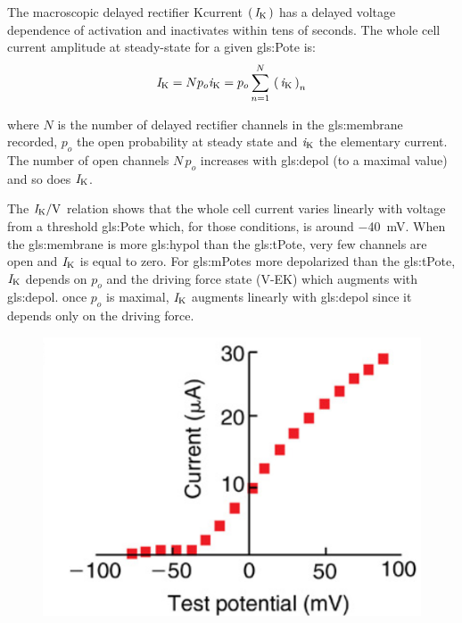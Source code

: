 \documentclass[class={myRUCProject}, crop=false]{standalone}
\begin{document}
The macroscopic delayed rectifier \gls{K}current \(\left(\,\mathit{I}_\mathrm{K}\,\right)\) has a delayed voltage dependence of activation and inactivates within tens of seconds. 
The whole cell current amplitude at steady-state for a given \gls{gls:Pote} is:
\begin{equation}\label{eq:ksum}
    \mathit{I}_\mathrm{K} = N p_o \mathit{i}_\mathrm{K} = p_o \sum^N_{n=1} \, \left(\,\mathit{i}_\mathrm{K}\,\right)_n 
\end{equation}

where \(N\) is the number of delayed rectifier channels in the \gls{gls:membrane} recorded, \(p_o\) the open probability at steady state and \(\mathit{i}_\mathrm{K}\) the elementary current. The number of open channels \(N\,p_o\) increases with \gls{gls:depol} (to a maximal value) and so does \(\mathit{I}_\mathrm{K}\). 

The \(\curr\potassium/\unit{\V}\) relation shows that the whole cell current varies linearly with voltage from a threshold \gls{gls:Pote} which, for those conditions, is around \qty{-40}{\mV}. When the \gls{gls:membrane} is more \gls{gls:hypol} than the \gls{gls:tPote}, very few channels are open and \(\mathit{I}_\mathrm{K}\) is equal to zero. For \glspl{gls:mPote} more depolarized than the \gls{gls:tPote}, \(\mathit{I}_\mathrm{K}\) depends on \(p_o\) and the driving force state (V-EK) which augments with \gls{gls:depol}. once \(p_o\) is maximal, \(\mathit{I}_\mathrm{K}\) augments linearly with \gls{gls:depol} since it depends only on the driving force. 

\begin{figure}[H]
  \centering
  \includegraphics[width=0.4\linewidth]{Pictures//Anakin/IK-V.png}
  \caption{}\label{fig:Kcurrent}
\end{figure}
\end{document}
